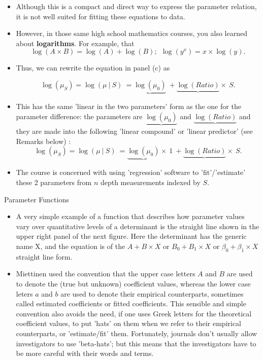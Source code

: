 \documentclass[10pt,handout]{beamer}\usepackage[]{graphicx}\usepackage[]{color}
\begin{document}
\begin{frame}
\begin{itemize}
	\item Although this is a compact and direct way to express the
	parameter relation, it is not well suited for fitting these equations to data. 
	
\item 	However, in those same  high school mathematics courses, you also learned about \textbf{logarithms}. For example, that 
	$$\log(A \times B) = \log(A) + \log(B); \ \  \log(y^x) = x \times \log(y).$$
	\pause 
	\item Thus, we can rewrite the equation in panel (c) as
	
	$$\log(\mu_S) = \log(\mu \ | \ S)  \ = \underbrace{\log(\mu_0)} \ +  \underbrace{\log(Ratio)} \times \ S.$$
	
	\item This has the same 'linear in the two parameters' form as the one for the parameter difference: the parameters are
	$\underbrace{\log(\mu_0)}$ and $\underbrace{\log(Ratio)}$ and they are made into the following 'linear compound' or 'linear predictor' (see Remarks below) :
	$$\log(\mu_S) = \log(\mu \ | \ S)  \ = \underbrace{\log(\mu_0)} \times \ 1 \ + \underbrace{\log(Ratio)} \times \ S.$$
	\pause 
\item 	The course is concerned with using 'regression' software to  'fit'/'estimate' these 2 parameters from $n$ depth measurements indexed by $S$.
	
\end{itemize}
\end{frame}


\begin{frame}{Parameter Functions}
\begin{itemize}
	\item A very simple example of a function that describes how  parameter values vary over quantitative levels of a determinant is the straight line shown in the upper right panel of the next figure. Here the determinant has the generic name X, and the equation is of the $A + B \times X$ or $B_0 + B_1 \times X$ or $\beta_0 + \beta_1 \times X$ straight line form. 
	
	\item Miettinen used the convention that the upper case letters $A$ and $B$ are used to denote the (true but unknown) coefficient values, whereas the lower case leters $a$ and $b$ are used to denote their empirical counterparts, sometimes called estimated coefficients or fitted coefficients.  This sensible and simple convention also avoids the need, if one uses Greek letters for the theoretical coefficient values, to put 'hats' on them when we refer to their empirical counterparts, or 'estimate/fit' them. Fortunately, journals don't usually allow investigators to use 'beta-hats'; but this means that the investigators have to be more careful with their words and terms.
	

\end{itemize}
\end{frame}
\end{document}
